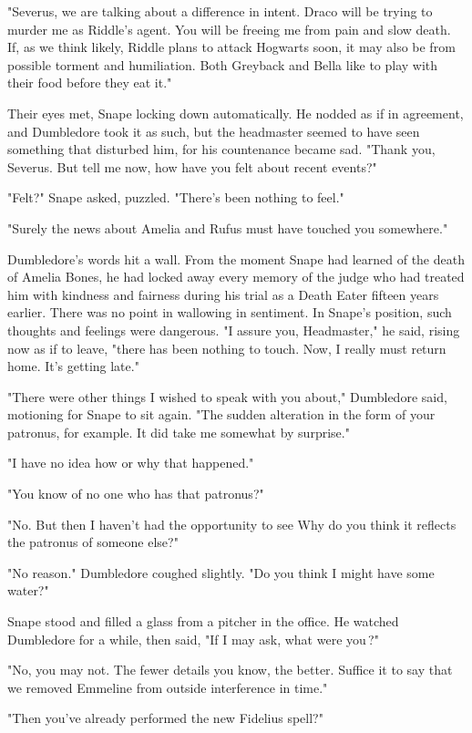 "Severus, we are talking about a difference in intent. Draco will be trying to murder me as Riddle's agent. You will be freeing me from pain and slow death. If, as we think likely, Riddle plans to attack Hogwarts soon, it may also be from possible torment and humiliation. Both Greyback and Bella like to play with their food before they eat it."

Their eyes met, Snape locking down automatically. He nodded as if in agreement, and Dumbledore took it as such, but the headmaster seemed to have seen something that disturbed him, for his countenance became sad. "Thank you, Severus. But tell me now, how have you felt about recent events?"

"Felt?" Snape asked, puzzled. "There's been nothing to feel."

"Surely the news about Amelia and Rufus must have touched you somewhere."

Dumbledore's words hit a wall. From the moment Snape had learned of the death of Amelia Bones, he had locked away every memory of the judge who had treated him with kindness and fairness during his trial as a Death Eater fifteen years earlier. There was no point in wallowing in sentiment. In Snape's position, such thoughts and feelings were dangerous. "I assure you, Headmaster," he said, rising now as if to leave, "there has been nothing to touch. Now, I really must return home. It's getting late."

"There were other things I wished to speak with you about," Dumbledore said, motioning for Snape to sit again. "The sudden alteration in the form of your patronus, for example. It did take me somewhat by surprise."

"I have no idea how or why that happened."

"You know of no one who has that patronus?"

"No. But then I haven't had the opportunity to see{\el} Why do you think it reflects the patronus of someone else?"

"No reason." Dumbledore coughed slightly. "Do you think I might have some water?"

Snape stood and filled a glass from a pitcher in the office. He watched Dumbledore for a while, then said, "If I may ask, what were you{\el}\,?"

"No, you may not. The fewer details you know, the better. Suffice it to say that we removed Emmeline from outside interference in time."

"Then you've already performed the new Fidelius spell?"

